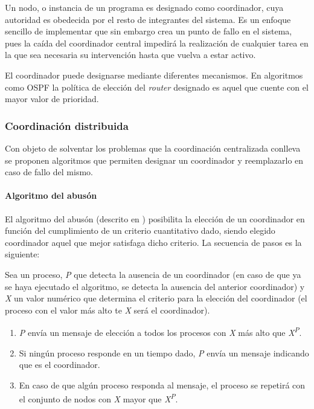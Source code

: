 Un nodo, o instancia de un programa es designado como coordinador, cuya autoridad es obedecida por el resto de integrantes del sistema. Es un enfoque sencillo de implementar que sin embargo crea un punto de fallo en el sistema, pues la caída del coordinador central impedirá la realización de cualquier tarea en la que sea necesaria su intervención hasta que vuelva a estar activo.

El coordinador puede designarse mediante diferentes mecanismos. En algoritmos como OSPF\cite{rfc2328} la política de elección del \textit{router} designado es aquel que cuente con el mayor valor de prioridad.
\subsubsection{Coordinación distribuida}

Con objeto de solventar los problemas que la coordinación centralizada conlleva se proponen algoritmos que permiten designar un coordinador y reemplazarlo en caso de fallo del mismo.

\paragraph{Algoritmo del abusón}

El algoritmo del abusón (descrito en \cite{Coulouris:2011:DSC:2029110:Ch15}) posibilita la elección de un coordinador en función del cumplimiento de un criterio cuantitativo dado, siendo elegido coordinador aquel que mejor satisfaga dicho criterio. La secuencia de pasos es la siguiente:

Sea un proceso, \textit{P} que detecta la ausencia de un coordinador (en caso de que ya se haya ejecutado el algoritmo, se detecta la ausencia del anterior coordinador) y \textit{X} un valor numérico que determina el criterio para la elección del coordinador (el proceso con el valor más alto te \textit{X} será el coordinador).
\begin{enumerate}
\item \textit{P} envía un mensaje de elección a todos los procesos con \textit{X} más alto que \textit{X\textsuperscript{P}}.
\item Si ningún proceso responde en un tiempo dado, \textit{P} envía un mensaje indicando que es el coordinador.
\item En caso de que algún proceso responda al mensaje, el proceso se repetirá con el conjunto de nodos con \textit{X} mayor que \textit{X\textsuperscript{P}}.
\end{enumerate}

